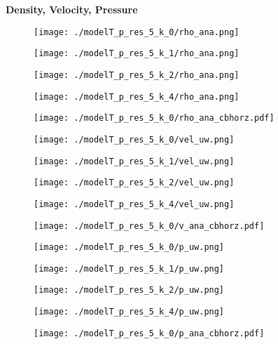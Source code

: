 \documentclass[12pt]{article}
\numberwithin{equation}{subsection}
\begin{document}
\newpage
\textbf{Density, Velocity, Pressure}
\begin{figure*}[!htb]
	
	\begin{multicols}{4}
		\texttt{[image: ./modelT\_p\_res\_5\_k\_0/rho\_ana.png]}\par
		\hspace{0.75in}
		\texttt{[image: ./modelT\_p\_res\_5\_k\_1/rho\_ana.png]}\par
		\hspace{1.5in}
		\texttt{[image: ./modelT\_p\_res\_5\_k\_2/rho\_ana.png]}\par
		\hspace{2.25in}
		\texttt{[image: ./modelT\_p\_res\_5\_k\_4/rho\_ana.png]}
	\end{multicols}
	\vspace{-0.3in}
	\begin{multicols}{1}
		\hspace{4.0in} \texttt{[image: ./modelT\_p\_res\_5\_k\_0/rho\_ana\_cbhorz.pdf]}
	\end{multicols}
	
	\vspace{-0.3in}
	
	\begin{multicols}{4}
		\texttt{[image: ./modelT\_p\_res\_5\_k\_0/vel\_uw.png]}\par
		\hspace{0.75in}
		\texttt{[image: ./modelT\_p\_res\_5\_k\_1/vel\_uw.png]}\par
		\hspace{1.5in}
		\texttt{[image: ./modelT\_p\_res\_5\_k\_2/vel\_uw.png]}\par
		\hspace{2.25in}
		\texttt{[image: ./modelT\_p\_res\_5\_k\_4/vel\_uw.png]}
	\end{multicols}
	\vspace{-0.3in}
	\begin{multicols}{1}
		\hspace{4.0in} \texttt{[image: ./modelT\_p\_res\_5\_k\_0/v\_ana\_cbhorz.pdf]}
	\end{multicols}
	
	\vspace{-0.3in}
	\begin{multicols}{4}
		\texttt{[image: ./modelT\_p\_res\_5\_k\_0/p\_uw.png]}\par
		\hspace{0.75in}
		\texttt{[image: ./modelT\_p\_res\_5\_k\_1/p\_uw.png]}\par
		\hspace{1.5in}
		\texttt{[image: ./modelT\_p\_res\_5\_k\_2/p\_uw.png]}\par
		\hspace{2.25in}
		\texttt{[image: ./modelT\_p\_res\_5\_k\_4/p\_uw.png]}
	\end{multicols}
	\vspace{-0.3in}
	\begin{multicols}{1}
		\hspace{4.0in} \texttt{[image: ./modelT\_p\_res\_5\_k\_0/p\_ana\_cbhorz.pdf]}
	\end{multicols}
	

\end{figure*}
\end{document}
